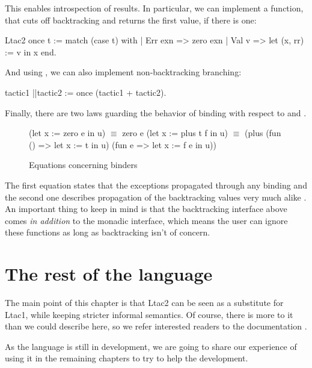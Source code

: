 This enables introspection of results.
In particular, we can implement a function, that cuts off backtracking and returns the first value, if there is one:
\begin{coq}
Ltac2 once t := match (case t) with
  | Err exn => zero exn
  | Val v => let (x, rr) := v in x
  end.
\end{coq}

And using , we can also implement non-backtracking branching:
\begin{coq}
tactic1 ||tactic2 := once (tactic1 + tactic2).
\end{coq}

Finally, there are two laws guarding the behavior of binding with respect to  and .
\begin{figure}[H]
\begin{coq}
(let x := zero e in u) $\equiv$ zero e
(let x := plus t f in u) $\equiv$ (plus (fun () => let x := t in u)
                                 (fun e => let x := f e in u))
\end{coq}
\caption{Equations concerning binders}
\label{fig:let_eq}
\end{figure}

The first equation states that the exceptions propagated through any binding and the second one describes propagation of the backtracking values very much alike .
An important thing to keep in mind is that the backtracking interface above comes \emph{in addition} to the monadic interface, which means the user can ignore these functions as long as backtracking isn't of concern.

\section{The rest of the language}
The main point of this chapter is that Ltac2 can be seen as a substitute for Ltac1, while keeping stricter informal semantics.
Of course, there is more to it than we could describe here, so we refer interested readers to the documentation \cite[Section 3.3.2]{thecoqdevelopmentteamCoqProofAssistant2020}.

As the language is still in development, we are going to share our experience of using it in the remaining chapters to try to help the development.

